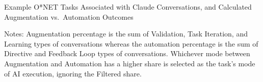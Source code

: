 \begin{landscape}
\begin{table}[!t]
    \caption{Example O*NET Tasks Associated with Claude Conversations, and Calculated Augmentation vs.\ Automation Outcomes}
    \label{tab:example_anthropic_AI_tasks}
    \footnotesize
    \centering
    
    \begin{minipage}{1\linewidth}
\begin{spacing}{0.2}
{\fontsize{9.5pt}{10pt}\selectfont Notes: Augmentation percentage is the sum of Validation, Task Iteration, and Learning types of conversations whereas the automation percentage is the sum of Directive and Feedback Loop types of conversations.
Whichever mode between Augmentation and Automation has a higher share is selected as the task's mode of AI execution, ignoring the Filtered share.}
\end{spacing}
\end{minipage}
\end{table}
\end{landscape}
